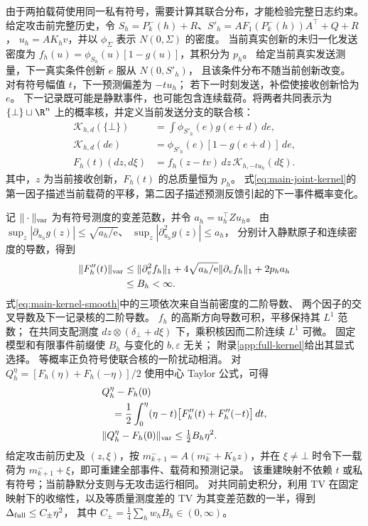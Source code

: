 由于两拍载荷使用同一私有符号，需要计算其联合分布，才能检验完整日志约束。
给定攻击前完整历史，令
$S_h=P_k^-(h)+R$、$S'_h=AF_1(P_k^-(h))A^\top+Q+R$，
$u_h=AK_hv$，并以 $\phi_\Sigma$ 表示 $N(0,\Sigma)$ 的密度。
当前真实创新的未归一化发送密度为
$f_h(u)=\phi_{S_h}(u)[1-g(u)]$，其积分为 $p_h$。
给定当前真实发送测量，下一真实条件创新 $e$ 服从 $N(0,S'_h)$，
且该条件分布不随当前创新改变。
对有符号幅值 $t$，下一预测偏差为 $-tu_h$；
若下一时刻发送，补偿使接收创新恰为 $e$。
下一记录既可能是静默事件，也可能包含连续载荷。将两者共同表示为
$\{\bot\}\sqcup\R^n$ 上的概率核，并定义当前发送分支的联合核：
\begin{equation}
 \begin{aligned}
 \mathcal K_{h,d}(\{\bot\})&=\int\phi_{S'_h}(e)g(e+d)\,de,\\
 \mathcal K_{h,d}(de)&=\phi_{S'_h}(e)[1-g(e+d)]\,de,\\
 F_h(t)(dz,d\xi)&=f_h(z-tv)\,dz\,\mathcal K_{h,-tu_h}(d\xi).
 \end{aligned}
 \label{eq:main-joint-kernel}
\end{equation}
其中，$z$ 为当前接收创新，$F_h(t)$ 的总质量恒为 $p_h$。
式\eqref{eq:main-joint-kernel}的第一因子描述当前载荷的平移，第二因子描述预测反馈引起的下一事件概率变化。

记 $\|\cdot\|_{\rm var}$ 为有符号测度的变差范数，并令 $a_h=u_h^\top Zu_h$。
由 $\sup_z|\partial_{u_h}g(z)|\le\sqrt{a_h/\mathrm e}$、
$\sup_z|\partial_{u_h}^2g(z)|\le a_h$，
分别计入静默原子和连续密度的导数，得到
\begin{equation}
 \begin{aligned}
 \|F_h''(t)\|_{\rm var}
 &\le \|\partial_v^2 f_h\|_1
 +4\sqrt{a_h/\mathrm e}\|\partial_v f_h\|_1
 +2p_ha_h\\
 &\le B_h<\infty.
 \end{aligned}
 \label{eq:main-kernel-smooth}
\end{equation}
式\eqref{eq:main-kernel-smooth}中的三项依次来自当前密度的二阶导数、
两个因子的交叉导数及下一记录核的二阶导数。
$f_h$ 的高斯方向导数可积，平移保持其 $L^1$ 范数；
在共同支配测度 $dz\otimes(\delta_\bot+d\xi)$ 下，乘积核因而二阶连续 $L^1$ 可微。
固定模型和有限事件前缀使 $B_h$ 与变化的 $b,\varepsilon$ 无关；
附录\ref{app:full-kernel}给出其显式选择。
等概率正负符号使联合核的一阶扰动相消。
对 $Q_h^\eta=[F_h(\eta)+F_h(-\eta)]/2$ 使用中心 Taylor 公式，可得
\begin{equation}
 \begin{aligned}
 &Q_h^\eta-F_h(0)\\
 &\quad=\frac12\int_0^\eta(\eta-t)
 \bigl[F_h''(t)+F_h''(-t)\bigr]\,dt,\\
 &\|Q_h^\eta-F_h(0)\|_{\rm var}\le \tfrac12B_h\eta^2.
 \end{aligned}
 \label{eq:main-kernel-taylor}
\end{equation}
给定攻击前历史及 $(z,\xi)$，按
$m_{k+1}^-=A(m_k^-+K_hz)$，并在 $\xi\ne\bot$ 时令下一载荷为
$m_{k+1}^-+\xi$，即可重建全部事件、载荷和预测记录。
该重建映射不依赖 $t$ 或私有符号；当前静默分支则与无攻击运行相同。
对共同前史积分，利用 TV 在固定映射下的收缩性，以及等质量测度差的
TV 为其变差范数的一半，得到
$\Delta_{\rm full}\le C_\pm\eta^2$，
其中 $C_\pm=\frac14\sum_hw_hB_h\in(0,\infty)$。
